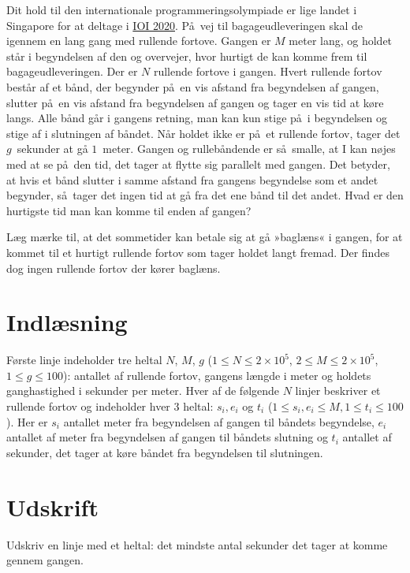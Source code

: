 
Dit hold til den internationale programmeringsolympiade er lige landet i Singapore for at deltage i
 \href{https://ioi2020.sg/}{IOI 2020}.
På vej til bagageudleveringen skal de igennem en lang gang med rullende fortove.
Gangen er $M$ meter lang, og holdet står i begyndelsen af den og overvejer, hvor hurtigt de kan komme frem til bagageudleveringen. 
Der er $N$ rullende fortove i gangen.
Hvert rullende fortov består af et bånd, der begynder på en vis afstand fra begyndelsen af gangen, slutter på en vis afstand fra begyndelsen af gangen og tager en vis tid at køre langs.
Alle bånd går i gangens retning, man kan kun stige på i begyndelsen og stige af i slutningen af båndet.
Når holdet ikke er på et rullende fortov, tager det $g$~sekunder at gå $1$~meter.
Gangen og rullebåndende er så smalle, at I kan nøjes med at se på den tid, det tager at flytte sig parallelt med gangen.
Det betyder, at hvis et bånd slutter i samme afstand fra gangens begyndelse som et andet begynder, så tager det ingen tid at gå fra det ene bånd til det andet.
Hvad er den hurtigste tid man kan komme til enden af gangen?

Læg mærke til, at det sommetider kan betale sig at gå »baglæns« i gangen, for at kommet til et hurtigt rullende fortov som tager holdet langt fremad.
Der findes dog ingen rullende fortov der kører baglæns.

\section*{Indlæsning}
Første linje indeholder tre heltal $N$, $M$, $g$ ($1 \le N \le 2 \times 10^5$, $2 \le M \le 2 \times 10^5$, $1 \le g \le 100$):
antallet af rullende fortov, gangens længde i meter og holdets ganghastighed i sekunder per meter.
Hver af de følgende $N$ linjer beskriver et rullende fortov og indeholder hver 3 heltal: $s_i, e_i$ og $t_i$
($1\leq s_i,e_i\leq M,1\leq t_i\leq100$).
Her er $s_i$  antallet meter fra begyndelsen af gangen til båndets begyndelse, $e_i$ antallet af meter fra begyndelsen af gangen til båndets slutning og $t_i$ antallet af sekunder, det tager at køre båndet fra begyndelsen til slutningen.

\section*{Udskrift}
Udskriv en linje med et heltal: det mindste antal sekunder det tager at komme gennem gangen.

